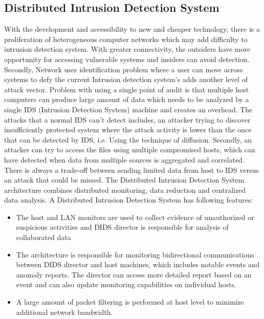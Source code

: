 \documentclass[11pt]{article}
\begin{document}
	\subsection{Distributed Intrusion Detection System}
	With the development and accessibility to new and cheaper technology, there is a proliferation of heterogeneous computer networks which may add difficulty to intrusion detection system. With greater connectivity, the outsiders have more opportunity for accessing vulnerable systems and insiders can avoid detection. Secondly, Network user identification problem where a user can move across systems to defy the current Intrusion detection system's adds another level of attack vector. Problem with using a single point of audit is that multiple host computers can produce large amount of data which needs to be analyzed by a single IDS (Intrusion Detection System) machine and creates an overhead. The attacks that a normal IDS can’t detect includes, an attacker trying to discover insufficiently protected system where the attack activity is lower than the once that can be detected by IDS, i.e. Using the technique of diffusion. Secondly, an attacker can try to access the files using multiple compromised hosts, which can have detected when data from multiple sources is aggregated and correlated. There is always a trade-off between sending limited data from host to IDS versus an attack that could be missed.
	The Distributed Intrusion Detection System architecture combines distributed monitoring, data reduction and centralized data analysis. A Distributed Intrusion Detection System has following features:
	\begin{itemize}
		\item The host and LAN monitors are used to collect evidence of unauthorized or suspicious activities and DIDS director is responsible for analysis of collaborated data
		\item The architecture is responsible for monitoring bidirectional communications between DIDS director and host machines, which includes notable events and anomaly reports. The director can access more detailed report based on an event and can also update monitoring capabilities on individual hosts.
		\item A large amount of packet filtering is performed at host level to minimize additional network bandwidth.
	\end{itemize}
\end{document}
